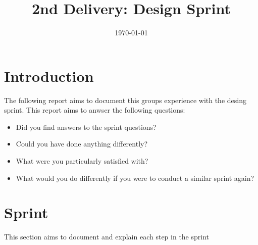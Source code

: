 \documentclass[12pt]{article}
\title{2nd Delivery: Design Sprint}
\date{\today}
\begin{document}
\subsectionfont{\fontsize{12}{14}\selectfont}

\maketitle

\tableofcontents

\section{Introduction}
The following report aims to document this groups experience with the desing sprint\cite{DesignSprint2024}.
This report aims to anwser the following questions:
\begin{itemize}
    \item Did you find answers to the sprint questions?
    \item Could you have done anything differently?
    \item What were you particularly satisfied with?
    \item What would you do differently if you were to conduct a similar sprint again?
\end{itemize}

\section{Sprint}
This section aims to document and explain each step in the sprint
\end{document}
